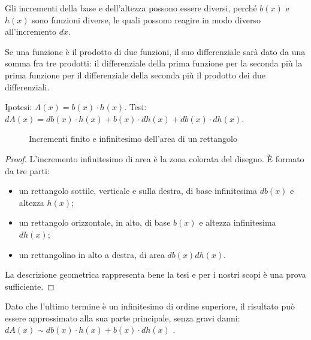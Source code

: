 \begin{osservazione}
Gli incrementi della base e dell'altezza possono essere 
diversi, perché $b(x)$ e $h(x)$ sono funzioni diverse, le quali possono
reagire in modo diverso all'incremento $dx$.
\end{osservazione}

\begin{teorema}
 Se una funzione è il prodotto di due funzioni, il suo  differenziale 
 sarà dato da una somma fra tre prodotti: il differenziale della
 prima funzione per la seconda più la prima funzione per il differenziale 
 della seconda più il prodotto dei due differenziali.
\end{teorema}
\noindent Ipotesi: $\mathit{A}(x)=b(x)\cdot h(x)$.\qquad 
Tesi: $d\mathit{A}(x)=db(x)\cdot h(x)+b(x)\cdot dh(x)+ db(x)\cdot dh(x)$.

\begin{figure}[h]
\begin{inaccessibleblock}
 \begin{center}
 \begin{minipage}[]{.38 \textwidth}
  \vspace{27mm} \incrementaleprodotto
 \end{minipage} 
 \hfill
 \begin{minipage}[]{.58 \textwidth}
  \differenzialeprodotto
 \end{minipage}
 \end{center}
\end{inaccessibleblock}
\caption{Incrementi finito e infinitesimo dell'area di un rettangolo} 
\label{fig:Incre_prodotto}
\end{figure}

\begin{proof}
L'incremento infinitesimo di area è la zona colorata del disegno. È 
formato da tre parti:
\begin{itemize} [noitemsep]
 \item un rettangolo sottile, verticale e sulla destra, di base
 infinitesima $db(x)$ e altezza $h(x)$;
 \item un rettangolo orizzontale, in alto, di base $b(x)$ e
 altezza infinitesima $dh(x)$;
 \item un rettangolino in alto a destra, di area $db(x) dh(x)$.
\end{itemize}
La descrizione geometrica rappresenta bene la tesi e per i nostri scopi è
una prova sufficiente. 
\end{proof}
Dato che l'ultimo termine è un infinitesimo di ordine
superiore, il risultato può essere approssimato alla sua parte principale, 
senza gravi danni: $d\mathit{A}(x)\sim db(x)\cdot h(x)+b(x)\cdot dh(x)$ .

